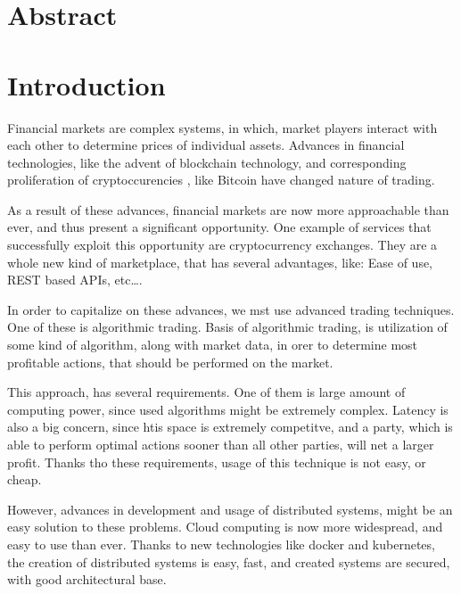 \chapter*{Abstract}
\label{abstract}









\chapter{Introduction}
\label{introduction}
Financial markets are complex systems, in which, market players interact with each other to determine
prices of individual assets. Advances in financial technologies, like the advent of blockchain technology,
and corresponding proliferation of cryptoccurencies , like Bitcoin have changed nature of trading.

As a result of these advances, financial markets are now more approachable than ever, and thus present a significant
opportunity. One example of services that successfully exploit this opportunity are cryptocurrency exchanges. They
are a whole new kind of marketplace, that has several advantages, like: Ease of use, REST based APIs, etc\ldots .

In order to capitalize on these advances, we mst use advanced trading techniques. One of these is algorithmic
trading. Basis of algorithmic trading, is utilization of some kind of algorithm, along with market data, in
orer to determine most profitable actions, that should be performed on the market.

This approach, has several requirements. One of them is large amount of computing power, since used algorithms
might be extremely complex. Latency is also a big concern, since htis space is extremely competitve, and a party,
which is able to perform optimal actions sooner than all other parties, will net a larger profit.
Thanks tho these requirements, usage of this technique is not easy, or cheap.

However, advances in development and usage of distributed systems, might be an easy solution to these problems.
Cloud computing is now more widespread, and easy to use than ever. Thanks to new technologies like
docker and kubernetes, the creation of distributed systems is easy, fast, and created
systems are secured, with good architectural base.


